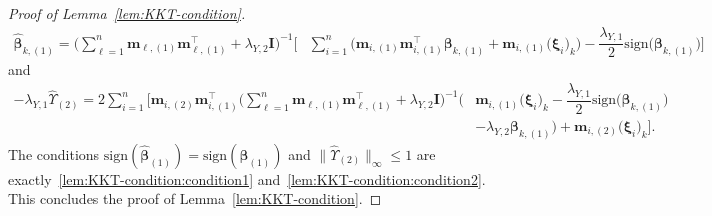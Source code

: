 \documentclass[
  12pt]{article}
\def\M{\mathbf{m}}
\begin{document}
\begin{proof}[Proof of Lemma~\ref{lem:KKT-condition}]
	\begin{align*}  
		\widehat{\bm{\beta}}_{k,(1)} = \Big(  \sum_{\ell = 1}^{n} \M_{\ell,(1)}   \M_{\ell , (1)}^{\top}  + \lambda_{Y,2} \mathbf{I}      \Big)^{-1} 
		\Big[ &  \sum_{i=1}^{n} \Big( \M_{i, (1)} \M_{i, (1)}^{\top}  \bm{\beta}_{k , (1)}  +  \M_{i,(1)}   \big( \bm{\xi}_{i} \big)_{k} \Big) 
		-   \dfrac{\lambda_{Y,1}}{2} \textrm{sign} \big( \bm{\beta}_{k,(1)} \big)  \Big]     
	\end{align*}
		\textrm{ and }
	\begin{align*}
		-\lambda_{Y,1} \widehat{ \Upsilon }_{(2)} =  2  \sum_{i=1}^{n}  \Big[   \M_{i,(2)} \M_{i,(1)}^{\top} \Big( \sum_{\ell = 1}^{n}  \M_{\ell , (1)} \M_{\ell , (1)}^{\top}  +  \lambda_{Y,2} \mathbf{I} \Big)^{-1}   
		\Big( & \M_{i,(1)} \big( \bm{\xi}_{i} \big)_{k} -  \dfrac{\lambda_{Y,1}}{2} \textrm{sign} \big( \bm{\beta}_{k,(1)} \big)  
		\\
		& -  \lambda_{Y,2} \bm{\beta}_{k,(1)} \Big) 
		 +  \M_{i,(2)}   \big( \bm{\xi}_{i} \big)_{k}  \Big]  . 
	\end{align*}
	The conditions $\textrm{sign}(\widehat{\bm{\beta}}_{(1)}) = \textrm{sign}(\bm{\beta}_{(1)})$ and $\big\| \widehat{ \Upsilon}_{(2)} \big\|_{\infty} \leq 1$ are exactly~\eqref{lem:KKT-condition:condition1} and~\eqref{lem:KKT-condition:condition2}. This concludes the proof of Lemma~\ref{lem:KKT-condition}.   
\end{proof}
\end{document}
